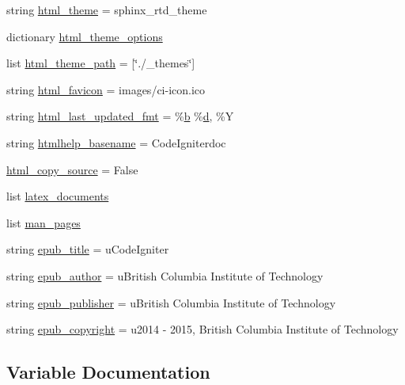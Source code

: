 \begin{DoxyCompactItemize}
string \hyperlink{namespaceconf_ae3cdb5291b613a54e31ca9520cddb940}{html\+\_\+theme} = \textquotesingle{}sphinx\+\_\+rtd\+\_\+theme\textquotesingle{}
\item 
dictionary \hyperlink{namespaceconf_abff8d0724bf3d78779f98fa828f1e1fe}{html\+\_\+theme\+\_\+options}
\item 
list \hyperlink{namespaceconf_ab3355566e70150ea4456b3249ce8fd24}{html\+\_\+theme\+\_\+path} = \mbox{[}\char`\"{}./\+\_\+themes\char`\"{}\mbox{]}
\item 
string \hyperlink{namespaceconf_a16a35b7581ad28822358fe74c1de14a2}{html\+\_\+favicon} = \textquotesingle{}images/ci-\/icon.\+ico\textquotesingle{}
\item 
string \hyperlink{namespaceconf_a14f49a7c55b2b5db78ffa82dc8a46648}{html\+\_\+last\+\_\+updated\+\_\+fmt} = \textquotesingle{}\%\hyperlink{bootstrap_8min_8js_a398bb8542498d1b14178b02b99df309b}{b} \%\hyperlink{jquery_8canvasjs_8min_8js_a36541169dfff685f807208881a4f0021}{d}, \%Y\textquotesingle{}
\item 
string \hyperlink{namespaceconf_a75a82d2191ce50cef1a4b6522da3c148}{htmlhelp\+\_\+basename} = \textquotesingle{}Code\+Igniterdoc\textquotesingle{}
\item 
\hyperlink{namespaceconf_a7ccc0b3d59ae620ede673e62fc9ab577}{html\+\_\+copy\+\_\+source} = False
\item 
list \hyperlink{namespaceconf_a19ce49f2838fb86624dc2d34e023baca}{latex\+\_\+documents}
\item 
list \hyperlink{namespaceconf_a09bebc3ead6c7c1acf6823c7a5609155}{man\+\_\+pages}
\item 
string \hyperlink{namespaceconf_a1d2f113ccea013e94bb23f7339033729}{epub\+\_\+title} = u\textquotesingle{}Code\+Igniter\textquotesingle{}
\item 
string \hyperlink{namespaceconf_a65d676afa893f71bef09ae1a4f1970d2}{epub\+\_\+author} = u\textquotesingle{}British Columbia Institute of Technology\textquotesingle{}
\item 
string \hyperlink{namespaceconf_a19616e2a147791c51388e107e7309c0f}{epub\+\_\+publisher} = u\textquotesingle{}British Columbia Institute of Technology\textquotesingle{}
\item 
string \hyperlink{namespaceconf_a8ea253124c547df38571acd738c10b1f}{epub\+\_\+copyright} = u\textquotesingle{}2014 -\/ 2015, British Columbia Institute of Technology\textquotesingle{}
\end{DoxyCompactItemize}


\subsection{Variable Documentation}
\hypertarget{namespaceconf_a6ad5f3290c14149f679301b770fa13f9}{}
